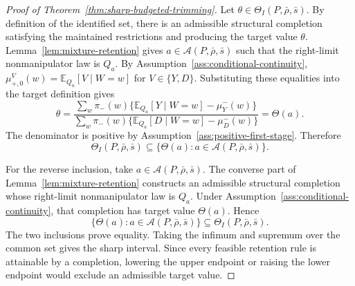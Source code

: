 \documentclass[11pt]{article}
\newcommand{\E}{\mathbb{E}}
\theoremstyle{definition}
\theoremstyle{plain}
\theoremstyle{remark}
\begin{document}
\begin{proof}[Proof of Theorem~\ref{thm:sharp-budgeted-trimming}]
Let \(\theta\in\Theta_I(P,\bar\rho,\bar s)\).  By definition of the identified set, there
is an admissible structural completion satisfying the maintained restrictions and producing
the target value \(\theta\).  Lemma~\ref{lem:mixture-retention} gives
\(a\in\mathcal A(P,\bar\rho,\bar s)\) such that the right-limit nonmanipulator law is
\(Q_a\).  By Assumption~\ref{ass:conditional-continuity},
\(\mu^V_{+,0}(w)=\E_{Q_a}[V\mid W=w]\) for \(V\in\{Y,D\}\).  Substituting these equalities
into the target definition gives
\[
  \theta
  =
  \frac{\sum_w \pi_-(w)\{\E_{Q_a}[Y\mid W=w]-\mu^-_Y(w)\}}
       {\sum_w \pi_-(w)\{\E_{Q_a}[D\mid W=w]-\mu^-_D(w)\}}
  =
  \Theta(a).
\]
The denominator is positive by Assumption~\ref{ass:positive-first-stage}.  Therefore
\[
  \Theta_I(P,\bar\rho,\bar s)\subseteq
  \{\Theta(a):a\in\mathcal A(P,\bar\rho,\bar s)\}.
\]

For the reverse inclusion, take \(a\in\mathcal A(P,\bar\rho,\bar s)\).  The converse part
of Lemma~\ref{lem:mixture-retention} constructs an admissible structural completion whose
right-limit nonmanipulator law is \(Q_a\).  Under Assumption~\ref{ass:conditional-continuity},
that completion has target value \(\Theta(a)\).  Hence
\[
  \{\Theta(a):a\in\mathcal A(P,\bar\rho,\bar s)\}
  \subseteq \Theta_I(P,\bar\rho,\bar s).
\]
The two inclusions prove equality.  Taking the infimum and supremum over the common set
gives the sharp interval.  Since every feasible retention rule is attainable by a
completion, lowering the upper endpoint or raising the lower endpoint would exclude an
admissible target value.
\end{proof}
\end{document}
